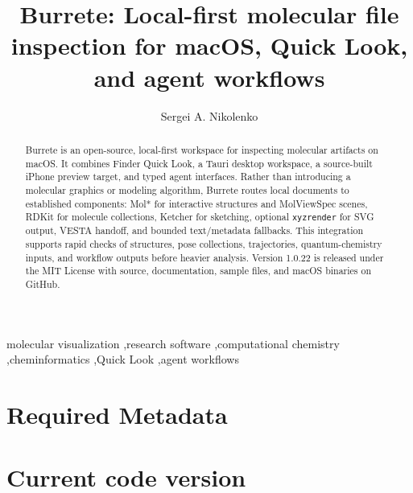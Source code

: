 \documentclass[preprint,12pt,a4paper]{elsarticle}
\begin{document}
\renewcommand{\labelenumii}{\arabic{enumi}.\arabic{enumii}}

\begin{frontmatter}

\title{Burrete: Local-first molecular file inspection for macOS, Quick Look, and agent workflows}

\author[ligandpro,innopolis]{Sergei A. Nikolenko}

\address[ligandpro]{Ligand Pro LLC, Bolshoy Boulevard 42, Building 1,
Skolkovo Innovation Center, Moscow 121205, Russia}
\address[innopolis]{Innopolis University, 1 Universitetskaya Street,
Innopolis 420500, Russia}

\begin{abstract}
Burrete is an open-source, local-first workspace for inspecting molecular
artifacts on macOS. It combines Finder Quick Look, a Tauri desktop workspace,
a source-built iPhone preview target, and typed agent interfaces. Rather than
introducing a molecular graphics or modeling algorithm, Burrete routes local
documents to established components: Mol* for interactive structures and
MolViewSpec scenes, RDKit for molecule collections, Ketcher for sketching,
optional \texttt{xyzrender} for SVG output, VESTA handoff, and bounded
text/metadata fallbacks. This integration supports rapid checks of structures,
pose collections, trajectories, quantum-chemistry inputs, and workflow outputs
before heavier analysis. Version 1.0.22 is released under the MIT License with
source, documentation, sample files, and macOS binaries on GitHub.
\end{abstract}

\begin{keyword}
molecular visualization \sep research software \sep computational chemistry
\sep cheminformatics \sep Quick Look \sep agent workflows
\end{keyword}

\end{frontmatter}

\section*{Required Metadata}

\section*{Current code version}
\end{document}
